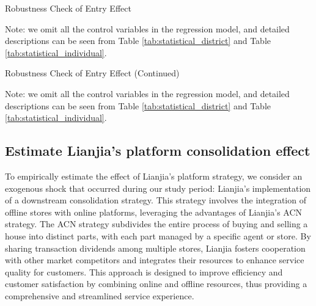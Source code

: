 \documentclass[11pt]{article}
\begin{document}
\begin{table}[H]
  \begin{center}
    \begin{scriptsize}
      \caption{Robustness Check of Entry Effect}
      \label{tab:entry_effect_robustness_1}
      
    
    Note: we omit all the control variables in the regression model, and detailed descriptions can be seen from Table \ref{tab:statistical_district} and Table \ref{tab:statistical_individual}.
    \end{scriptsize}
  \end{center}
\end{table}

\begin{table}[H]
  \begin{center}
    \begin{scriptsize}
      \caption{Robustness Check of Entry Effect (Continued)}
      \label{tab:entry_effect_robustness_2}
      
    
    Note: we omit all the control variables in the regression model, and detailed descriptions can be seen from Table \ref{tab:statistical_district} and Table \ref{tab:statistical_individual}.
    \end{scriptsize}
  \end{center}
\end{table}

\subsection{Estimate Lianjia's platform consolidation effect} \label{subsec:acn_strategy}

To empirically estimate the effect of Lianjia's platform strategy, we consider an exogenous shock that occurred during our study period: Lianjia's implementation of a downstream consolidation strategy. This strategy involves the integration of offline stores with online platforms, leveraging the advantages of Lianjia's ACN strategy. The ACN strategy subdivides the entire process of buying and selling a house into distinct parts, with each part managed by a specific agent or store. By sharing transaction dividends among multiple stores, Lianjia fosters cooperation with other market competitors and integrates their resources to enhance service quality for customers. This approach is designed to improve efficiency and customer satisfaction by combining online and offline resources, thus providing a comprehensive and streamlined service experience. 
\end{document}
